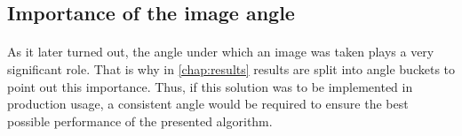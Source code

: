 \subsection{Importance of the image angle} \label{subsect:angle_importance}
\paragraph{}
As it later turned out, the angle under which an image was taken plays a very significant role. That is why in \autoref{chap:results} results are split into angle buckets to point out this importance. Thus, if this solution was to be implemented in production usage, a consistent angle would be required to ensure the best possible performance of the presented algorithm.











